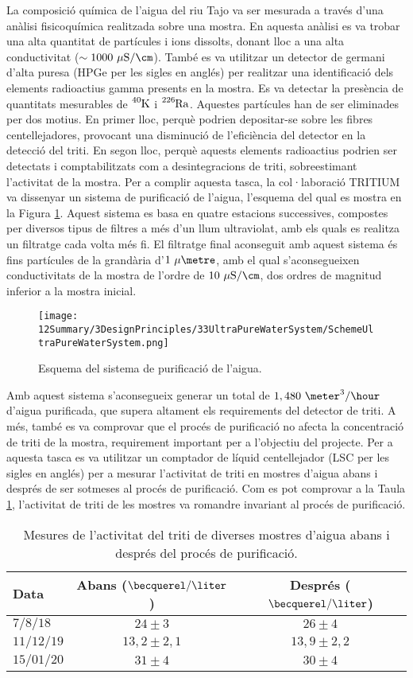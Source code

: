 La composició química de l'aigua del riu Tajo va ser mesurada a través d'una anàlisi fisicoquímica realitzada sobre una mostra. En aquesta anàlisi es va trobar una alta quantitat de partícules i ions dissolts, donant lloc a una alta conductivitat ($\sim 1000~\mu\text{S}/\cm$). També es va utilitzar un detector de germani d'alta puresa (HPGe per les sigles en anglés) per realitzar una identificació dels elements radioactius gamma presents en la mostra. Es va detectar la presència de quantitats mesurables de $\ce{^{40}K}$ i $\ce{^{226}Ra}$. Aquestes partícules han de ser eliminades per dos motius. En primer lloc, perquè podrien depositar-se sobre les fibres centellejadores, provocant una disminució de l'eficiència del detector en la detecció del triti. En segon lloc, perquè aquests elements radioactius podrien ser detectats i comptabilitzats com a desintegracions de triti, sobreestimant l'activitat de la mostra. Per a complir aquesta tasca, la col·laboració TRITIUM va dissenyar un sistema de purificació de l'aigua, l'esquema del qual es mostra en la Figura \ref{fig:EsquemaSistemaAiguaUltrapura}. Aquest sistema es basa en quatre estacions successives, compostes per diversos tipus de filtres a més d'un llum ultraviolat, amb els quals es realitza un filtratge cada volta més fi. El filtratge final aconseguit amb aquest sistema és fins partícules de la grandària d'$1~\mu\metre$, amb el qual s'aconsegueixen conductivitats de la mostra de l'ordre de $10~\mu\text{S}/\cm$, dos ordres de magnitud inferior a la mostra inicial.
\begin{figure}[htbp]
\centering
\texttt{[image: 12Summary/3DesignPrinciples/33UltraPureWaterSystem/SchemeUltraPureWaterSystem.png]}
\caption{Esquema del sistema de purificació de l'aigua.\label{fig:EsquemaSistemaAiguaUltrapura}}
\end{figure}
Amb aquest sistema s'aconsegueix generar un total de $1,480~\meter^3/\hour$ d'aigua purificada, que supera altament els requirements del detector de triti. A més, també es va comprovar que el procés de purificació no afecta la concentració de triti de la mostra, requirement important per a l'objectiu del projecte. Per a aquesta tasca es va utilitzar un comptador de líquid centellejador (LSC per les sigles en anglés) per a mesurar l'activitat de triti en mostres d'aigua abans i després de ser sotmeses al procés de purificació. Com es pot comprovar a la Taula \ref{tab:ValorsActivitatTriti}, l'activitat de triti de les mostres va romandre invariant al procés de purificació.

\begin{table}[htbp]
\centering{}%
\begin{tabular}{lcc}
\toprule 
Data & Abans ($\becquerel/\liter$) & Després ($\becquerel/\liter$) \tabularnewline
\midrule
\midrule 
$7/8/18$ & $24 \pm 3$ & $26 \pm 4$ \tabularnewline
$11/12/19$ & $13,2 \pm 2,1$ & $13,9 \pm 2,2$ \tabularnewline
$15/01/20$ & $31 \pm 4$ & $30 \pm 4$ \tabularnewline
\bottomrule
\end{tabular}
\caption{Mesures de l'activitat del triti de diverses mostres d'aigua abans i després del procés de purificació.}
\label{tab:ValorsActivitatTriti}
\end{table}

